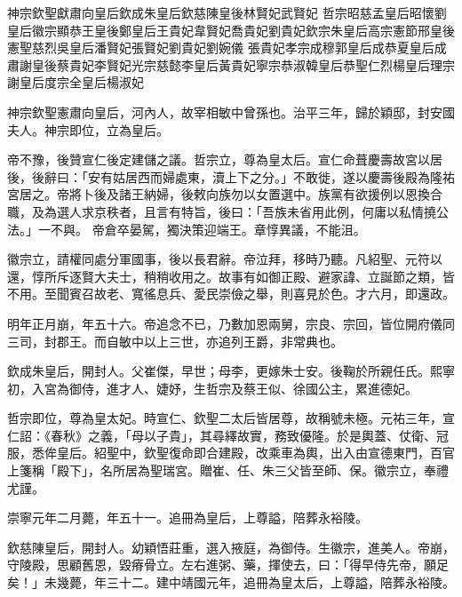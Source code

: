 
\begin{pinyinscope}

 神宗欽聖獻肅向皇后欽成朱皇后欽慈陳皇後林賢妃武賢妃
 哲宗昭慈孟皇后昭懷劉皇后徽宗顯恭王皇後鄭皇后王貴妃韋賢妃喬貴妃劉貴妃欽宗朱皇后高宗憲節邢皇後憲聖慈烈吳皇后潘賢妃張賢妃劉貴妃劉婉儀
 張貴妃孝宗成穆郭皇后成恭夏皇后成肅謝皇後蔡貴妃李賢妃光宗慈懿李皇后黃貴妃寧宗恭淑韓皇后恭聖仁烈楊皇后理宗謝皇后度宗全皇后楊淑妃



 神宗欽聖憲肅向皇后，河內人，故宰相敏中曾孫也。治平三年，歸於穎邸，封安國夫人。神宗即位，立為皇后。



 帝不豫，後贊宣仁後定建儲之議。哲宗立，尊為皇太后。宣仁命葺慶壽故宮以居後，後辭曰：「安有姑居西而婦處東，瀆上下之分。」不敢徙，遂以慶壽後殿為隆祐宮居之。帝將卜後及諸王納婦，後敕向族勿以女置選中。族黨有欲援例以恩換合職，及為選人求京秩者，且言有特旨，後曰：「吾族未省用此例，何庸以私情撓公法。」一不與。
 帝倉卒晏駕，獨決策迎端王。章惇異議，不能沮。



 徽宗立，請權同處分軍國事，後以長君辭。帝泣拜，移時乃聽。凡紹聖、元符以還，惇所斥逐賢大夫士，稍稍收用之。故事有如御正殿、避家諱、立誕節之類，皆不用。至聞賓召故老、寬徭息兵、愛民崇儉之舉，則喜見於色。才六月，即還政。



 明年正月崩，年五十六。帝追念不已，乃數加恩兩舅，宗良、宗回，皆位開府儀同三司，封郡王。而自敏中以上三世，亦追列王爵，非常典也。



 欽成朱皇后，開封人。父崔傑，早世；母李，更嫁朱士安。後鞠於所親任氏。熙寧初，入宮為御侍，進才人、婕妤，生哲宗及蔡王似、徐國公主，累進德妃。



 哲宗即位，尊為皇太妃。時宣仁、欽聖二太后皆居尊，故稱號未極。元祐三年，宣仁詔：《春秋》之義，「母以子貴」，其尋繹故實，務致優隆。於是輿蓋、仗衛、冠服，悉侔皇后。紹聖中，欽聖復命即合建殿，改乘車為輿，出入由宣德東門，百官上箋稱「殿下」，名所居為聖瑞宮。贈崔、任、朱三父皆至師、保。徽宗立，奉禮
 尤謹。



 崇寧元年二月薨，年五十一。追冊為皇后，上尊謚，陪葬永裕陵。



 欽慈陳皇后，開封人。幼穎悟莊重，選入掖庭，為御侍。生徽宗，進美人。帝崩，守陵殿，思顧舊恩，毀瘠骨立。左右進粥、藥，揮使去，曰：「得早侍先帝，願足矣！」未幾薨，年三十二。建中靖國元年，追冊為皇太后，上尊謚，陪葬永裕陵。




\end{pinyinscope}
